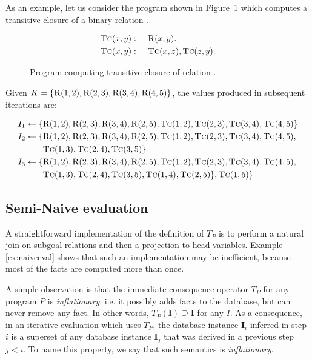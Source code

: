 \begin{exmp}
As an example, let us consider the program shown in Figure~\ref{ex:tcofr} which computes a transitive closure of a binary relation .
\begin{figure}[!htbp]
\begin{align*}
\textsc{Tc}(x, y) &:-~ \textsc{R}(x, y).\\
\textsc{Tc}(x, y) &:-~ \textsc{Tc}(x, z), \textsc{Tc}(z, y).
\end{align*}
\caption{Program computing transitive closure of relation \label{ex:tcofr}.}
\end{figure}

Given $K = \{\textsc{R}(1, 2), \textsc{R}(2, 3), \textsc{R}(3, 4), \textsc{R}(4, 5)\}$, the values produced in subsequent iterations are:

\begin{align*}
I_1 \leftarrow \{&\textsc{R}(1, 2), \textsc{R}(2, 3), \textsc{R}(3, 4), \textsc{R}(2, 5), \textsc{Tc}(1, 2), \textsc{Tc}(2, 3), \textsc{Tc}(3, 4), \textsc{Tc}(4, 5)\}\\
I_2 \leftarrow \{&\textsc{R}(1, 2), \textsc{R}(2, 3), \textsc{R}(3, 4), \textsc{R}(2, 5), \textsc{Tc}(1, 2), \textsc{Tc}(2, 3), \textsc{Tc}(3, 4), \textsc{Tc}(4, 5), \\
&\textsc{Tc}(1, 3), \textsc{Tc}(2, 4), \textsc{Tc}(3, 5)\}\\
I_3 \leftarrow \{&\textsc{R}(1, 2), \textsc{R}(2, 3), \textsc{R}(3, 4), \textsc{R}(2, 5), \textsc{Tc}(1, 2), \textsc{Tc}(2, 3), \textsc{Tc}(3, 4), \textsc{Tc}(4, 5),\\
& \textsc{Tc}(1, 3), \textsc{Tc}(2, 4), \textsc{Tc}(3, 5), \textsc{Tc}(1, 4), \textsc{Tc}(2, 5)\}, \textsc{Tc}(1, 5)\}\\
\end{align*}
\label{ex:naiveeval}
\end{exmp}

\subsection{Semi-Naive evaluation}\label{ss:seminaiveevaldatalog}
A straightforward implementation of the definition of $T_P$ is to perform a natural join on subgoal relations and then a projection to head variables. Example \ref{ex:naiveeval} shows that such an implementation may be inefficient, because most of the facts are computed more than once.

A simple observation is that the immediate consequence operator $T_P$ for any program $P$ is \emph{inflationary}, i.e. it possibly adds facts to the database, but can never remove any fact. In other words, $T_P(\textbf{I}) \supseteq \textbf{I}$ for any $I$. As a consequence, in an iterative evaluation which uses $T_P$, the database instance $\textbf{I}_i$ inferred in step $i$ is a superset of any database instance $\textbf{I}_j$ that was derived in a previous step $j < i$. To name this property, we say that such semantics is \emph{inflationary}.

